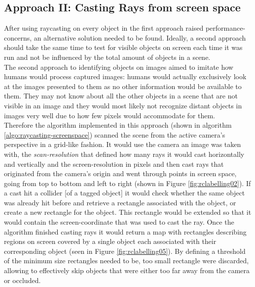 \subsection{Approach II: Casting Rays from screen space}
After using raycasting on every object in the first approach raised performance-concerns, an alternative solution needed to be found. Ideally, a second approach should take the same time to test for visible objects on screen each time it was run and not be influenced by the total amount of objects in a scene.\\
The second approach to identifying objects on images aimed to imitate how humans would process captured images: humans would actually exclusively look at the images presented to them as no other information would be available to them. They may not know about all the other objects in a scene that are not visible in an image and they would most likely not recognize distant objects in images very well due to how few pixels would accommodate for them.\\
Therefore the algorithm implemented in this approach (shown in algorithm \ref{algo:raycasting-screenspace}) scanned the scene from the active camera's perspective in a grid-like fashion. It would use the camera an image was taken with, the \textit{scan-resolution} that defined how many rays it would cast horizontally and vertically and the screen-resolution in pixels and then cast rays that originated from the camera's origin and went through points in screen space, going from top to bottom and left to right (shown in Figure \ref{fig:rclabelling02}). If a cast hit a collider [of a tagged object] it would check whether the same object was already hit before and retrieve a rectangle associated with the object, or create a new rectangle for the object. This rectangle would be extended so that it would contain the screen-coordinate that was used to cast the ray. Once the algorithm finished casting rays it would return a map with rectangles describing regions on screen covered by a single object each associated with their corresponding object (seen in Figure \ref{fig:rclabelling05}). By defining a threshold of the minimum size rectangles needed to be, too small rectangle were discarded, allowing to effectively skip objects that were either too far away from the camera or occluded.\\

